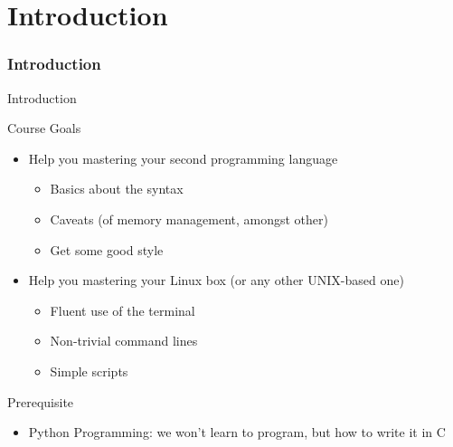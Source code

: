 \setcounter{part}{-1}
\part{Introduction}
\makeatletter{}\makeatother
\section{Introduction}
\begin{frame}{Introduction}
  \begin{block}{Course Goals}
    \begin{itemize}
    \item Help you mastering your second programming language
      \begin{itemize}
      \item Basics about the syntax
      \item Caveats (of memory management, amongst other)
      \item Get some good style
      \end{itemize}
    \item Help you mastering your Linux box (or any other UNIX-based one)
      \begin{itemize}
      \item Fluent use of the terminal
      \item Non-trivial command lines
      \item Simple scripts
      \end{itemize}

    \end{itemize}
  \end{block}

  \begin{block}{Prerequisite}
    \begin{itemize}
    \item Python Programming: we won't learn to program, but how to write it in C
    \end{itemize}
  \end{block}

\end{frame}
